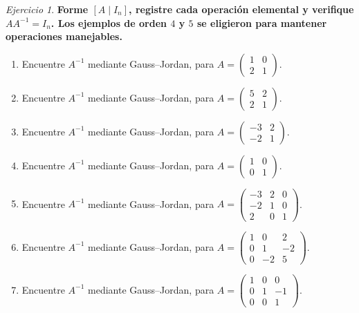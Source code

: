 \documentclass[12pt]{article}
\theoremstyle{remark}
\newtheorem{Ejer}[definicion]{Ejercicio}
\begin{document}
\begin{Ejer}

\textbf{Forme $[A\mid I_n]$, registre cada operación elemental y verifique $AA^{-1}=I_n$. Los ejemplos de orden $4$ y $5$ se eligieron para mantener operaciones manejables.}\par\medskip
\begin{enumerate}[resume=banco]

\item Encuentre $A^{-1}$ mediante Gauss--Jordan, para $A=\begin{pmatrix}1&0\\2&1\end{pmatrix}$.

\item Encuentre $A^{-1}$ mediante Gauss--Jordan, para $A=\begin{pmatrix}5&2\\2&1\end{pmatrix}$.

\item Encuentre $A^{-1}$ mediante Gauss--Jordan, para $A=\begin{pmatrix}-3&2\\-2&1\end{pmatrix}$.

\item Encuentre $A^{-1}$ mediante Gauss--Jordan, para $A=\begin{pmatrix}1&0\\0&1\end{pmatrix}$.

\item Encuentre $A^{-1}$ mediante Gauss--Jordan, para $A=\begin{pmatrix}-3&2&0\\-2&1&0\\2&0&1\end{pmatrix}$.

\item Encuentre $A^{-1}$ mediante Gauss--Jordan, para $A=\begin{pmatrix}1&0&2\\0&1&-2\\0&-2&5\end{pmatrix}$.

\item Encuentre $A^{-1}$ mediante Gauss--Jordan, para $A=\begin{pmatrix}1&0&0\\0&1&-1\\0&0&1\end{pmatrix}$.


\end{enumerate}
\end{Ejer}
\end{document}
